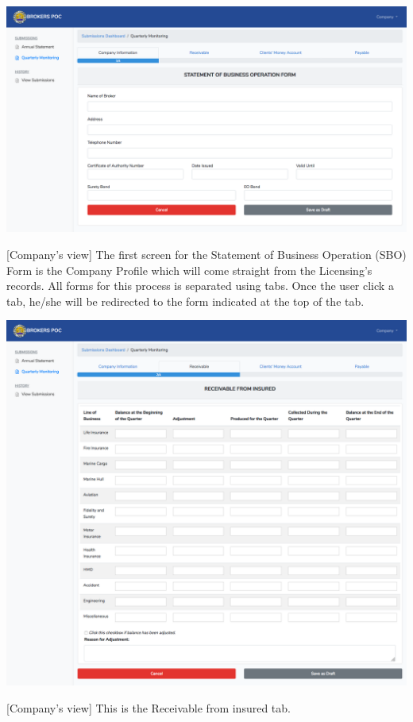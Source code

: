 \documentclass{article}
\begin{document}
\noindent{}\includegraphics[keepaspectratio=true]{up-ic-screens/image55}{}%

[Company’s view] The first screen for the Statement
of Business Operation (SBO) Form is the Company Profile which will come
straight from the Licensing’s records. All forms for this process is
separated using tabs. Once the user click a tab, he/she will be
redirected to the form indicated at the top of the tab.%

\includegraphics[keepaspectratio=true]{up-ic-screens/image160}{}%

[Company’s view] This is the Receivable from insured
tab.%
\end{document}
